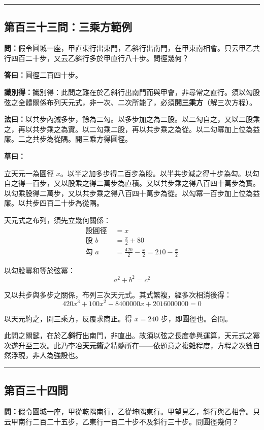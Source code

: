 \documentclass[11pt,a4paper]{article}
\newcommand{\longline}{\noindent\rule{\textwidth}{0.4pt}}
\newcommand{\wen}[1]{\par\noindent\textbf{\textcolor{probcolor}{問：}}{#1}\par}
\newcommand{\da}[1]{\par\noindent\textbf{\textcolor{anscolor}{答曰：}}{#1}\par}
\newcommand{\fayue}[1]{\par\noindent\textbf{\textcolor{methodcolor}{法曰：}}{#1}\par}
\newcommand{\caoyue}[1]{\par\noindent\textbf{草曰：}{#1}\par}
\newcommand{\zhi}[1]{\par\noindent\textbf{識別得：}{#1}\par}
\begin{document}
\vspace{0.5cm}
\longline

\subsection*{第百三十三問：三乘方範例}
\wen{假令圓城一座，甲直東行出東門，乙斜行出南門，在甲東南相會。只云甲乙共行四百二十步，又云乙斜行多於甲直行八十步。問徑幾何？}

\da{圓徑二百四十步。}

\zhi{識別得：此問之難在於乙斜行出南門而與甲會，非尋常之直行。須以勾股弦之全體關係布列天元式，非一次、二次所能了，必須\textbf{開三乘方}（解三次方程）。}

\fayue{以共步內減多步，餘為二勾。以多步加之為二股。以二勾自之，又以二股乘之，再以共步乘之為實。以二勾乘二股，再以共步乘之為從。以二勾冪加上位為益廉。二之共步為從隅。開三乘方得圓徑。}

\caoyue{
立天元一為圓徑 $x$。以半之加多步得二百步為股。以半共步減之得十步為勾。以勾自之得一百步，又以股乘之得二萬步為直積。又以共步乘之得八百四十萬步為實。以勾乘股得二萬步，又以共步乘之得八百四十萬步為從。以勾冪一百步加上位為益廉。以共步四百二十步為從隅。

天元式之布列，須先立幾何關係：
\begin{align*}
\text{設圓徑 } &= x \\
\text{股 } b &= \frac{x}{2} + 80 \\
\text{勾 } a &= \frac{420}{2} - \frac{x}{2} = 210 - \frac{x}{2}
\end{align*}

以勾股冪和等於弦冪：
$$a^2 + b^2 = c^2$$

又以共步與多步之關係，布列三次天元式。其式繁複，經多次相消後得：
$$420x^3 + 100x^2 - 8400000x + 2016000000 = 0$$

以天元約之，開三乘方，反覆求商正。得 $x = 240$ 步，即圓徑也。合問。

此問之關鍵，在於乙\textbf{斜行}出南門，非直出。故須以弦之長度參與運算，天元式之冪次遂升至三次。此乃李冶\textbf{天元術}之精髓所在——依題意之複雜程度，方程之次數自然浮現，非人為強設也。
}

\vspace{0.5cm}
\longline

\subsection*{第百三十四問}
\wen{假令圓城一座，甲從乾隅南行，乙從坤隅東行。甲望見乙，斜行與乙相會。只云甲南行二百二十五步，乙東行一百二十步不及斜行三十步。問圓徑幾何？}
\end{document}
